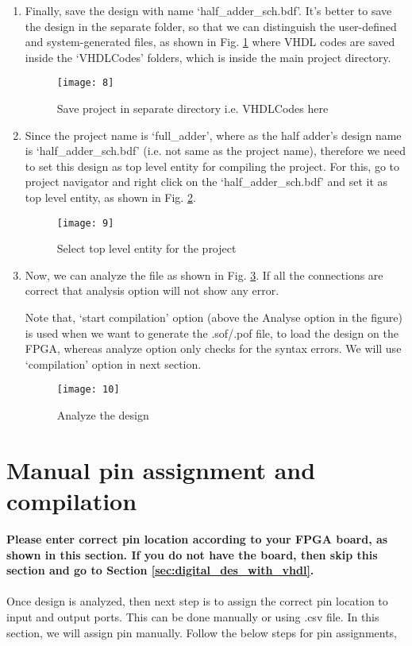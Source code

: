 \begin{enumerate}
\item Finally, save the design with name `half\_adder\_sch.bdf'. It's better to save the design in the separate folder, so that we can distinguish the user-defined and system-generated files, as shown in Fig. \ref{fig:save_project} where VHDL codes are saved inside the `VHDLCodes' folders, which is inside the main project directory. 

\begin{figure}
	\centering
	\texttt{[image: 8]}
	\caption{Save project in separate directory i.e. VHDLCodes here}
	\label{fig:save_project}
\end{figure}

\item Since the project name is `full\_adder', where as the half adder's design name is `half\_adder\_sch.bdf' (i.e. not same as the project name), therefore we need to set this design as top level entity for compiling the project. For this, go to project navigator and right click on the `half\_adder\_sch.bdf' and set it as top level entity, as shown in Fig. \ref{fig:top_level_project}.  

\begin{figure}
	\centering
	\texttt{[image: 9]}
	\caption{Select top level entity for the project}
	\label{fig:top_level_project}
\end{figure}

\item Now, we can analyze the file as shown in Fig. \ref{fig:analyze_design}. If all the connections are correct that analysis option will not show any error. 

 Note that, `start compilation' option (above the Analyse option in the figure) is used when we want to generate the .sof/.pof file, to load the design on the FPGA, whereas analyze option only checks for the syntax errors. We will use `compilation' option in next section. 

\begin{figure}
	\centering
	\texttt{[image: 10]}
	\caption{Analyze the design}
	\label{fig:analyze_design}
\end{figure}

\end{enumerate}

\section{Manual pin assignment and compilation} \label{sec:compile}
\textbf{Please enter correct pin location according to your FPGA board, as shown in this section. If you do not have the board, then skip this section and go to Section \ref{sec:digital_des_with_vhdl}.}
\\
\\	
Once design is analyzed, then next step is to assign the correct pin location to input and output ports. This can be done manually or using .csv file. In this section, we will assign pin manually. Follow the below steps for pin assignments, 


